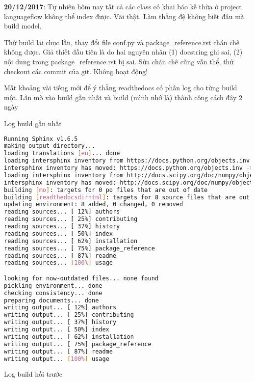 \noindent \textbf{20/12/2017}: Tự nhiên hôm nay tất cả các class có khai báo kế thừa ở project languageflow không thể index được. Vãi thật. Làm thằng đệ không biết đâu mà build model.

Thử build lại chục lần, thay đổi file conf.py và package\_reference.rst chán chê không được. Giả thiết đầu tiên là do hai nguyên nhân (1) docstring ghi sai, (2) nội dung trong package\_reference.rst bị sai. Sửa chán chê cũng vẫn thể, thử checkout các commit của git. Không hoạt động!

Mất khoảng vài tiếng mới để ý thằng readthedocs có phần log cho từng build một. Lần mò vào build gần nhất và build (mình nhớ là) thành công cách đây 2 ngày

\noindent Log build gần nhất

\begin{lstlisting}[language=bash]
Running Sphinx v1.6.5
making output directory...
loading translations [en]... done
loading intersphinx inventory from https://docs.python.org/objects.inv...
intersphinx inventory has moved: https://docs.python.org/objects.inv -> https://docs.python.org/2/objects.inv
loading intersphinx inventory from http://docs.scipy.org/doc/numpy/objects.inv...
intersphinx inventory has moved: http://docs.scipy.org/doc/numpy/objects.inv -> https://docs.scipy.org/doc/numpy/objects.inv
building [mo]: targets for 0 po files that are out of date
building [readthedocsdirhtml]: targets for 8 source files that are out of date
updating environment: 8 added, 0 changed, 0 removed
reading sources... [ 12%] authors
reading sources... [ 25%] contributing
reading sources... [ 37%] history
reading sources... [ 50%] index
reading sources... [ 62%] installation
reading sources... [ 75%] package_reference
reading sources... [ 87%] readme
reading sources... [100%] usage

looking for now-outdated files... none found
pickling environment... done
checking consistency... done
preparing documents... done
writing output... [ 12%] authors
writing output... [ 25%] contributing
writing output... [ 37%] history
writing output... [ 50%] index
writing output... [ 62%] installation
writing output... [ 75%] package_reference
writing output... [ 87%] readme
writing output... [100%] usage
\end{lstlisting}

Log build hồi trước

